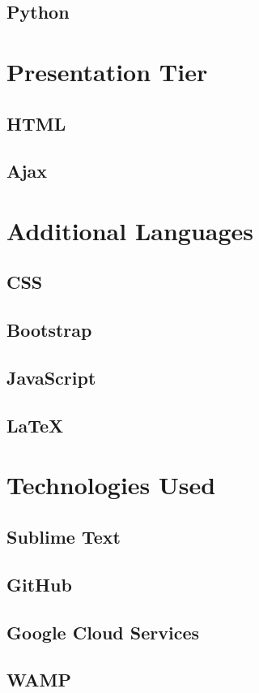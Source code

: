 \subsection{Python}


\section{Presentation Tier}
\subsection{HTML}
\subsection{Ajax}

\section{Additional Languages}
\subsection{CSS}
\subsection{Bootstrap}
\subsection{JavaScript}
\subsection{LaTeX}

\section{Technologies Used}
\subsection{Sublime Text}
\subsection{GitHub}
\subsection{Google Cloud Services}
\subsection{WAMP}
